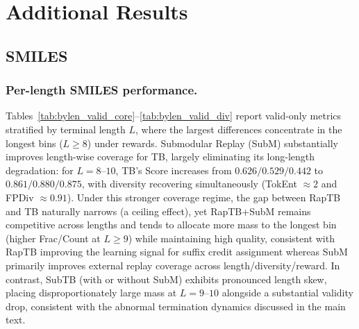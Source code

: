 \documentclass{article}
\theoremstyle{plain}
\theoremstyle{definition}
\theoremstyle{remark}
\begin{document}



\newpage
\appendix
\onecolumn
\newcommand{\NA}{\textcolor{gray}{--}}

\captionsetup{font=small,labelfont=bf}

\section{Additional Results}
\label{app:results}

\subsection{SMILES}
\label{app:results_smiles}

\subsubsection{Per-length SMILES performance.}
Tables~\ref{tab:bylen_valid_core}--\ref{tab:bylen_valid_div} report valid-only metrics stratified by terminal length $L$,
where the largest differences concentrate in the longest bins ($L\ge 8$) under rewards.
Submodular Replay (SubM) substantially improves length-wise coverage for TB, largely eliminating its long-length degradation:
for $L=8$--$10$, TB's Score increases from $0.626/0.529/0.442$ to $0.861/0.880/0.875$,
with diversity recovering simultaneously (TokEnt $\approx 2$ and FPDiv $\approx 0.91$).
Under this stronger coverage regime, the gap between RapTB and TB naturally narrows (a ceiling effect),
yet RapTB+SubM remains competitive across lengths and tends to allocate more mass to the longest bin
(higher Frac/Count at $L\ge 9$) while maintaining high quality, consistent with RapTB improving the learning signal for suffix credit assignment
whereas SubM primarily improves external replay coverage across length/diversity/reward.
In contrast, SubTB (with or without SubM) exhibits pronounced length skew, placing disproportionately large mass at $L=9$--$10$
alongside a substantial validity drop, consistent with the abnormal termination dynamics discussed in the main text.
\end{document}
